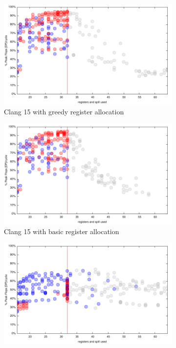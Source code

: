 \documentclass{article}
\begin{document}
\begin{figure}[h!]
\begin{subfigure}[h]{0.45\textwidth}
\includegraphics[width=\textwidth]{../benches/gemm/cascadelake-64x256x64/greedy.pdf}
  \caption{Clang 15 with greedy register allocation}
  \end{subfigure}
  \begin{subfigure}[h]{0.45\textwidth}  
\includegraphics[width=\textwidth]{../benches/gemm/cascadelake-64x256x64/basic.pdf}
  \caption{Clang 15 with basic register allocation}
  \end{subfigure}
  \begin{subfigure}[h]{0.45\textwidth}  
\includegraphics[width=\textwidth]{../benches/gemm/cascadelake-64x256x64/gcc-11.9.pdf}

\end{subfigure}
\end{figure}
\end{document}
